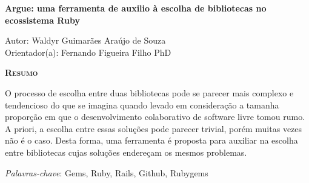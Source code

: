 \begin{center}
	{\Large{\textbf{Argue: uma ferramenta de auxilio à escolha de bibliotecas no ecossistema Ruby}}}
\end{center}

\vspace{1cm}

\begin{flushright}
	Autor: Waldyr Guimarães Araújo de Souza\\
	Orientador(a): Fernando Figueira Filho PhD
\end{flushright}

\vspace{1cm}

\begin{center}
	\Large{\textsc{\textbf{Resumo}}}
\end{center}

\noindent O processo de escolha entre duas bibliotecas pode se parecer mais complexo e tendencioso do que se imagina quando levado em consideração a tamanha proporção em que o desenvolvimento colaborativo de software livre tomou rumo. A priori, a escolha entre essas soluções pode parecer trivial, porém muitas vezes não é o caso. Desta forma, uma ferramenta é proposta para auxiliar na escolha entre bibliotecas cujas soluções endereçam os mesmos problemas.

\noindent\textit{Palavras-chave}: Gems, Ruby, Rails, Github, Rubygems